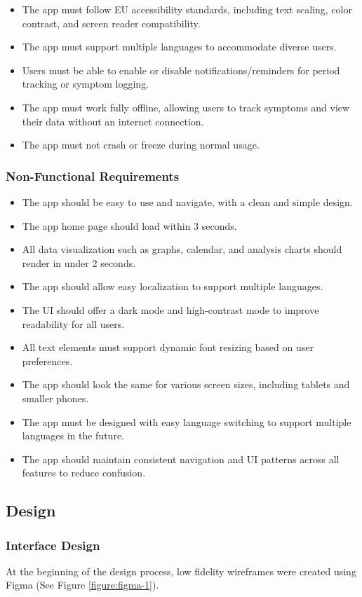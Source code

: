 \begin{itemize}
      \item The app must follow EU accessibility standards, including text scaling, color contrast, and screen reader compatibility.
      \item The app must support multiple languages to accommodate diverse users.
      \item Users must be able to enable or disable notifications/reminders for period tracking or symptom logging.
      \item The app must work fully offline, allowing users to track symptoms and view their data without an internet connection.
      \item The app must not crash or freeze during normal usage.
\end{itemize}

\subsubsection{Non-Functional Requirements}
\begin{itemize}
  \item The app should be easy to use and navigate, with a clean and simple design.
  \item The app home page should load within 3 seconds.
  \item All data visualization such as graphs, calendar, and analysis charts should render in under 2 seconds.
  \item The app should allow easy localization to support multiple languages.
  \item The UI should offer a dark mode and high-contrast mode to improve readability for all users.
  \item All text elements must support dynamic font resizing based on user preferences.
  \item The app should look the same for various screen sizes, including tablets and smaller phones.
  \item The app must be designed with easy language switching to support multiple languages in the future.
  \item The app should maintain consistent navigation and UI patterns across all features to reduce confusion.
\end{itemize}

\subsection{Design}

\subsubsection{Interface Design}
At the beginning of the design process, low fidelity wireframes were created using Figma (See Figure \ref{figure:figma-1}).

